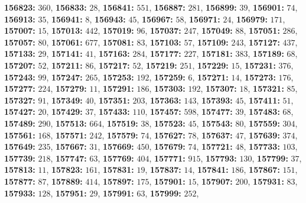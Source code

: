 \textsf{\bfseries 156823:} $360$, \textsf{\bfseries 156833:} $28$, \textsf{\bfseries 156841:} $551$, \textsf{\bfseries 156887:} $281$, \textsf{\bfseries 156899:} $39$, \textsf{\bfseries 156901:} $74$, \textsf{\bfseries 156913:} $35$, \textsf{\bfseries 156941:} $8$, \textsf{\bfseries 156943:} $45$, \textsf{\bfseries 156967:} $58$, \textsf{\bfseries 156971:} $24$, \textsf{\bfseries 156979:} $171$, \textsf{\bfseries 157007:} $15$, \textsf{\bfseries 157013:} $442$, \textsf{\bfseries 157019:} $96$, \textsf{\bfseries 157037:} $247$, \textsf{\bfseries 157049:} $88$, \textsf{\bfseries 157051:} $286$, \textsf{\bfseries 157057:} $80$, \textsf{\bfseries 157061:} $677$, \textsf{\bfseries 157081:} $83$, \textsf{\bfseries 157103:} $57$, \textsf{\bfseries 157109:} $243$, \textsf{\bfseries 157127:} $437$, \textsf{\bfseries 157133:} $29$, \textsf{\bfseries 157141:} $41$, \textsf{\bfseries 157163:} $284$, \textsf{\bfseries 157177:} $227$, \textsf{\bfseries 157181:} $383$, \textsf{\bfseries 157189:} $68$, \textsf{\bfseries 157207:} $52$, \textsf{\bfseries 157211:} $86$, \textsf{\bfseries 157217:} $52$, \textsf{\bfseries 157219:} $251$, \textsf{\bfseries 157229:} $15$, \textsf{\bfseries 157231:} $376$, \textsf{\bfseries 157243:} $99$, \textsf{\bfseries 157247:} $265$, \textsf{\bfseries 157253:} $192$, \textsf{\bfseries 157259:} $6$, \textsf{\bfseries 157271:} $14$, \textsf{\bfseries 157273:} $176$, \textsf{\bfseries 157277:} $224$, \textsf{\bfseries 157279:} $11$, \textsf{\bfseries 157291:} $186$, \textsf{\bfseries 157303:} $192$, \textsf{\bfseries 157307:} $18$, \textsf{\bfseries 157321:} $85$, \textsf{\bfseries 157327:} $91$, \textsf{\bfseries 157349:} $40$, \textsf{\bfseries 157351:} $203$, \textsf{\bfseries 157363:} $143$, \textsf{\bfseries 157393:} $45$, \textsf{\bfseries 157411:} $51$, \textsf{\bfseries 157427:} $20$, \textsf{\bfseries 157429:} $37$, \textsf{\bfseries 157433:} $110$, \textsf{\bfseries 157457:} $598$, \textsf{\bfseries 157477:} $39$, \textsf{\bfseries 157483:} $68$, \textsf{\bfseries 157489:} $290$, \textsf{\bfseries 157513:} $664$, \textsf{\bfseries 157519:} $38$, \textsf{\bfseries 157523:} $45$, \textsf{\bfseries 157543:} $80$, \textsf{\bfseries 157559:} $304$, \textsf{\bfseries 157561:} $168$, \textsf{\bfseries 157571:} $242$, \textsf{\bfseries 157579:} $74$, \textsf{\bfseries 157627:} $78$, \textsf{\bfseries 157637:} $47$, \textsf{\bfseries 157639:} $374$, \textsf{\bfseries 157649:} $235$, \textsf{\bfseries 157667:} $31$, \textsf{\bfseries 157669:} $450$, \textsf{\bfseries 157679:} $74$, \textsf{\bfseries 157721:} $48$, \textsf{\bfseries 157733:} $103$, \textsf{\bfseries 157739:} $218$, \textsf{\bfseries 157747:} $63$, \textsf{\bfseries 157769:} $404$, \textsf{\bfseries 157771:} $915$, \textsf{\bfseries 157793:} $130$, \textsf{\bfseries 157799:} $37$, \textsf{\bfseries 157813:} $11$, \textsf{\bfseries 157823:} $161$, \textsf{\bfseries 157831:} $19$, \textsf{\bfseries 157837:} $14$, \textsf{\bfseries 157841:} $186$, \textsf{\bfseries 157867:} $151$, \textsf{\bfseries 157877:} $87$, \textsf{\bfseries 157889:} $414$, \textsf{\bfseries 157897:} $175$, \textsf{\bfseries 157901:} $15$, \textsf{\bfseries 157907:} $200$, \textsf{\bfseries 157931:} $83$, \textsf{\bfseries 157933:} $128$, \textsf{\bfseries 157951:} $29$, \textsf{\bfseries 157991:} $63$, \textsf{\bfseries 157999:} $252$, 
